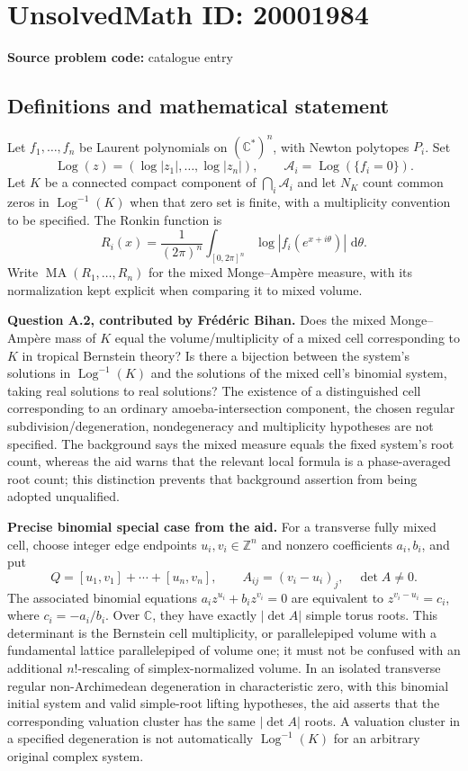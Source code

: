 \documentclass[11pt]{article}
\newcommand{\Z}{\mathbb{Z}}
\newcommand{\C}{\mathbb{C}}
\newcommand{\dd}{\,\mathrm{d}}
\begin{document}
\section*{UnsolvedMath ID: 20001984}
\textbf{Source problem code:} catalogue entry
\subsection{Definitions and mathematical statement}
Let $f_1,\ldots,f_n$ be Laurent polynomials on $(\C^*)^n$, with Newton polytopes $P_i$. Set
\[
 \operatorname{Log}(z)=(\log|z_1|,\ldots,\log|z_n|),\qquad
 \mathcal A_i=\operatorname{Log}(\{f_i=0\}).
\]
Let $K$ be a connected compact component of $\bigcap_i\mathcal A_i$ and let $N_K$ count common zeros in $\operatorname{Log}^{-1}(K)$ when that zero set is finite, with a multiplicity convention to be specified. The Ronkin function is
\[
 R_i(x)=\frac1{(2\pi)^n}\int_{[0,2\pi]^n}
          \log|f_i(e^{x+i\theta})|\,\dd\theta.
\]
Write $\operatorname{MA}(R_1,\ldots,R_n)$ for the mixed Monge--Amp\`ere measure, with its normalization kept explicit when comparing it to mixed volume.

\textbf{Question A.2, contributed by Fr\'ed\'eric Bihan.} Does the mixed Monge--Amp\`ere mass of $K$ equal the volume/multiplicity of a mixed cell corresponding to $K$ in tropical Bernstein theory? Is there a bijection between the system's solutions in $\operatorname{Log}^{-1}(K)$ and the solutions of the mixed cell's binomial system, taking real solutions to real solutions? The existence of a distinguished cell corresponding to an ordinary amoeba-intersection component, the chosen regular subdivision/degeneration, nondegeneracy and multiplicity hypotheses are not specified. The background says the mixed measure equals the fixed system's root count, whereas the aid warns that the relevant local formula is a phase-averaged root count; this distinction prevents that background assertion from being adopted unqualified.

\textbf{Precise binomial special case from the aid.} For a transverse fully mixed cell, choose integer edge endpoints $u_i,v_i\in\Z^n$ and nonzero coefficients $a_i,b_i$, and put
\[
 Q=[u_1,v_1]+\cdots+[u_n,v_n],\qquad
 A_{ij}=(v_i-u_i)_j,\quad\det A\ne0.
\]
The associated binomial equations $a_i z^{u_i}+b_i z^{v_i}=0$ are equivalent to $z^{v_i-u_i}=c_i$, where $c_i=-a_i/b_i$. Over $\C$, they have exactly $|\det A|$ simple torus roots. This determinant is the Bernstein cell multiplicity, or parallelepiped volume with a fundamental lattice parallelepiped of volume one; it must not be confused with an additional $n!$-rescaling of simplex-normalized volume. In an isolated transverse regular non-Archimedean degeneration in characteristic zero, with this binomial initial system and valid simple-root lifting hypotheses, the aid asserts that the corresponding valuation cluster has the same $|\det A|$ roots. A valuation cluster in a specified degeneration is not automatically $\operatorname{Log}^{-1}(K)$ for an arbitrary original complex system.
\end{document}
